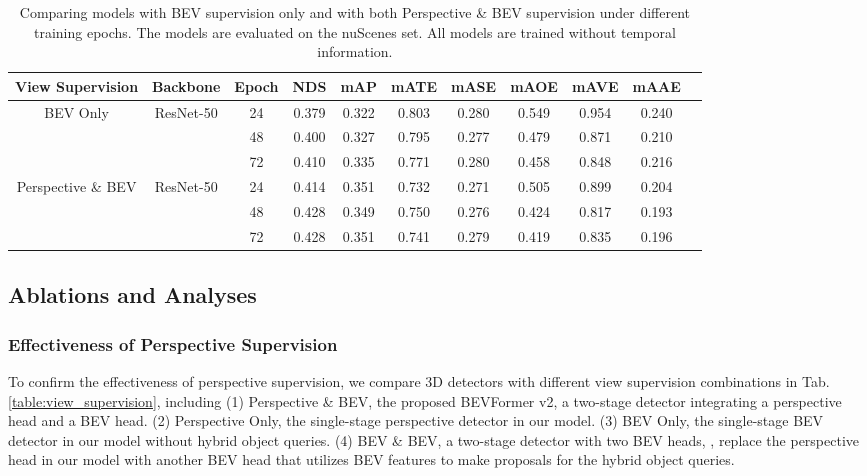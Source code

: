 \documentclass[10pt,twocolumn,letterpaper]{article}
\begin{document}
\begin{table*}[t]
    \caption{Comparing models with BEV supervision only and with both Perspective \& BEV supervision under different training epochs. The models are evaluated on the nuScenes  set. All models are trained without temporal information.}
    \label{table:long_schedule}
    \centering

    \begin{tabular}{c|c|c|cc|cccccc}
        \toprule
        View Supervision & Backbone & Epoch  & NDS & mAP & mATE & mASE & mAOE & mAVE & mAAE   \\ 
        \midrule 
        \multirow{3}{*}{BEV Only} & \multirow{3}{*}{ResNet-50} & 24 & 0.379 & 0.322 & 0.803 & 0.280 & 0.549 & 0.954 & 0.240 \\ 
         &  & 48 & 0.400 & 0.327 & 0.795 & 0.277 & 0.479 & 0.871 & 0.210 \\ 
         &  & 72 & 0.410 & 0.335 & 0.771 & 0.280 & 0.458 & 0.848 & 0.216 \\ 
        \midrule
        \multirow{3}{*}{Perspective \& BEV} & \multirow{3}{*}{ResNet-50} & 24 &  0.414 & 0.351 & 0.732 & 0.271 & 0.505 & 0.899 & 0.204 \\ 
         &  & 48 & 0.428 & 0.349 & 0.750 & 0.276 & 0.424 & 0.817 & 0.193 \\ 
         &  & 72 & 0.428 & 0.351 & 0.741 & 0.279 & 0.419 & 0.835 & 0.196 \\ 
        \midrule
        \bottomrule
    \end{tabular}
\end{table*} 

\subsection{Ablations and Analyses}
\subsubsection{Effectiveness of Perspective Supervision} 
To confirm the effectiveness of perspective supervision, we compare 3D detectors with different view supervision combinations in Tab. \ref{table:view_supervision}, including 
(1) Perspective \& BEV, the proposed BEVFormer v2, a two-stage detector integrating a perspective head and a BEV head. 
(2) Perspective Only, the single-stage perspective detector in our model. 
(3) BEV Only, the single-stage BEV detector in our model without hybrid object queries. 
(4) BEV \& BEV, a two-stage detector with two BEV heads, \ie, replace the perspective head in our model with another BEV head that utilizes BEV features to make proposals for the hybrid object queries. 
\end{document}
